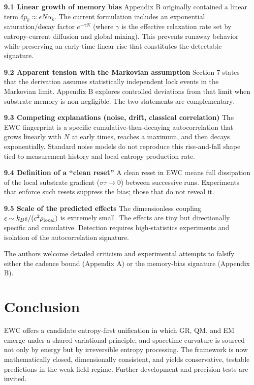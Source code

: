 \documentclass[11pt,letterpaper]{article}
\begin{document}
\textbf{9.1 Linear growth of memory bias}  
Appendix B originally contained a linear term \(\delta p_k \approx \epsilon N \alpha_k\). The current formulation includes an exponential saturation/decay factor \(e^{-\gamma N}\) (where \(\gamma\) is the effective relaxation rate set by entropy-current diffusion and global mixing). This prevents runaway behavior while preserving an early-time linear rise that constitutes the detectable signature.

\textbf{9.2 Apparent tension with the Markovian assumption}  
Section 7 states that the derivation assumes statistically independent lock events in the Markovian limit. Appendix B explores controlled deviations from that limit when substrate memory is non-negligible. The two statements are complementary.

\textbf{9.3 Competing explanations (noise, drift, classical correlation)}  
The EWC fingerprint is a specific cumulative-then-decaying autocorrelation that grows linearly with \(N\) at early times, reaches a maximum, and then decays exponentially. Standard noise models do not reproduce this rise-and-fall shape tied to measurement history and local entropy production rate.

\textbf{9.4 Definition of a ``clean reset''}  
A clean reset in EWC means full dissipation of the local substrate gradient (\(\sigma \tau \to 0\)) between successive runs. Experiments that enforce such resets suppress the bias; those that do not reveal it.

\textbf{9.5 Scale of the predicted effects}  
The dimensionless coupling \(\epsilon \sim k_B s / (c^2 \rho_{\rm local})\) is extremely small. The effects are tiny but directionally specific and cumulative. Detection requires high-statistics experiments and isolation of the autocorrelation signature.

The authors welcome detailed criticism and experimental attempts to falsify either the cadence bound (Appendix A) or the memory-bias signature (Appendix B).

\section{Conclusion}
EWC offers a candidate entropy-first unification in which GR, QM, and EM emerge under a shared variational principle, and spacetime curvature is sourced not only by energy but by irreversible entropy processing. The framework is now mathematically closed, dimensionally consistent, and yields conservative, testable predictions in the weak-field regime. Further development and precision tests are invited.
\end{document}
